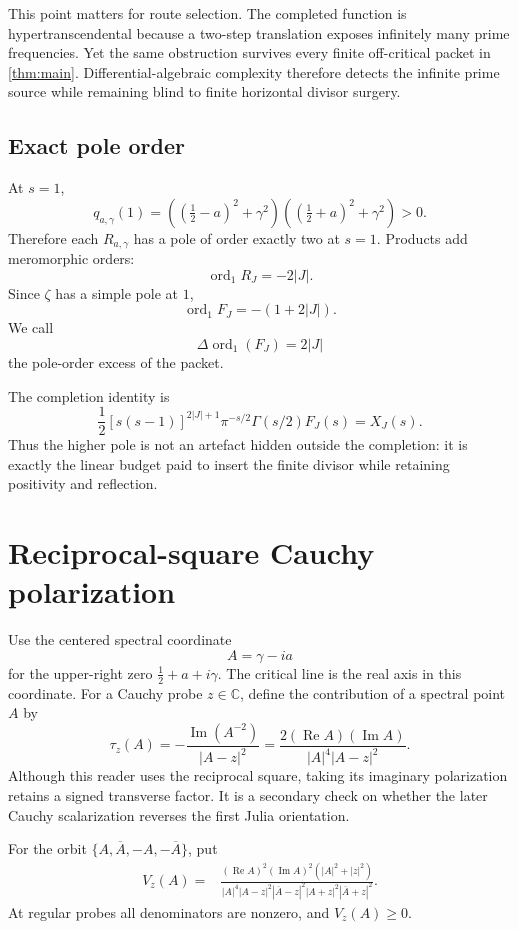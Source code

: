 \documentclass[11pt]{article}
\newcommand{\C}{\mathbb C}
\newcommand{\ord}{\operatorname{ord}}
\newcommand{\re}{\operatorname{Re}}
\newcommand{\im}{\operatorname{Im}}
\begin{document}
This point matters for route selection.  The completed function is
hypertranscendental because a two-step translation exposes infinitely many
prime frequencies.  Yet the same obstruction survives every finite
off-critical packet in \cref{thm:main}.  Differential-algebraic complexity
therefore detects the infinite prime source while remaining blind to
finite horizontal divisor surgery.

\subsection{Exact pole order}

At \(s=1\),
\[
 q_{a,\gamma}(1)
 =\left(\left(\tfrac12-a\right)^2+\gamma^2\right)
  \left(\left(\tfrac12+a\right)^2+\gamma^2\right)>0.
\]
Therefore each \(R_{a,\gamma}\) has a pole of order exactly two at
\(s=1\).  Products add meromorphic orders:
\[
 \ord_{1}R_J=-2|J|.
\]
Since \(\zeta\) has a simple pole at \(1\),
\[
 \ord_{1}F_J=-(1+2|J|).
\]
We call
\[
 \Delta\ord_1(F_J)=2|J|
\]
the pole-order excess of the packet.

The completion identity is
\[
 \frac12[s(s-1)]^{2|J|+1}
   \pi^{-s/2}\Gamma(s/2)F_J(s)
 =X_J(s).
\]
Thus the higher pole is not an artefact hidden outside the completion:
it is exactly the linear budget paid to insert the finite divisor while
retaining positivity and reflection.

\section{Reciprocal-square Cauchy polarization}
\label{sec:orientation}

Use the centered spectral coordinate
\[
 A=\gamma-ia
\]
for the upper-right zero \(\frac12+a+i\gamma\).  The critical line is
the real axis in this coordinate.  For a Cauchy probe \(z\in\C\), define
the contribution of a spectral point \(A\) by
\[
 \tau_z(A)
 =-\frac{\im(A^{-2})}{|A-z|^2}
 =\frac{2(\re A)(\im A)}
 {|A|^4|A-z|^2}.
\]
Although this reader uses the reciprocal square, taking its imaginary
polarization retains a signed transverse factor.  It is a secondary check
on whether the later Cauchy scalarization reverses the first Julia
orientation.

For the orbit
\(\{A,\overline A,-A,-\overline A\}\), put
\[
\begin{aligned}
V_z(A)
={}&
\frac{(\re A)^2(\im A)^2(|A|^2+|z|^2)}
{|A|^4
 |A-z|^2|\overline A-z|^2
 |A+z|^2|\overline A+z|^2}.
\end{aligned}
\]
At regular probes all denominators are nonzero, and \(V_z(A)\geq0\).
\end{document}
